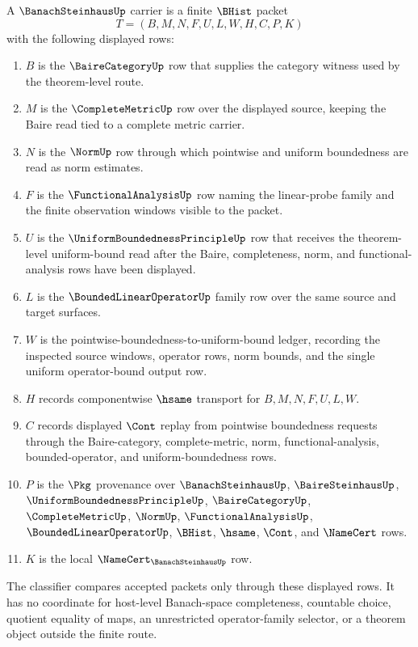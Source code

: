 \begin{definition}
\label{def:banach-steinhaus-carrier}
A $\BanachSteinhausUp$ carrier is a finite $\BHist$ packet
$$
T=(B,M,N,F,U,L,W,H,C,P,K)
$$
with the following displayed rows:
\begin{enumerate}
\item $B$ is the $\BaireCategoryUp$ row that supplies the category witness used by the theorem-level route.
\item $M$ is the $\CompleteMetricUp$ row over the displayed source, keeping the Baire read tied to a complete metric carrier.
\item $N$ is the $\NormUp$ row through which pointwise and uniform boundedness are read as norm estimates.
\item $F$ is the $\FunctionalAnalysisUp$ row naming the linear-probe family and the finite observation windows visible to the packet.
\item $U$ is the $\UniformBoundednessPrincipleUp$ row that receives the theorem-level uniform-bound read after the Baire, completeness, norm, and functional-analysis rows have been displayed.
\item $L$ is the $\BoundedLinearOperatorUp$ family row over the same source and target surfaces.
\item $W$ is the pointwise-boundedness-to-uniform-bound ledger, recording the inspected source windows, operator rows, norm bounds, and the single uniform operator-bound output row.
\item $H$ records componentwise $\hsame$ transport for $B,M,N,F,U,L,W$.
\item $C$ records displayed $\Cont$ replay from pointwise boundedness requests through the Baire-category, complete-metric, norm, functional-analysis, bounded-operator, and uniform-boundedness rows.
\item $P$ is the $\Pkg$ provenance over $\BanachSteinhausUp$, $\BaireSteinhausUp$, $\UniformBoundednessPrincipleUp$, $\BaireCategoryUp$, $\CompleteMetricUp$, $\NormUp$, $\FunctionalAnalysisUp$, $\BoundedLinearOperatorUp$, $\BHist$, $\hsame$, $\Cont$, and $\NameCert$ rows.
\item $K$ is the local $\NameCert_{\BanachSteinhausUp}$ row.
\end{enumerate}
The classifier compares accepted packets only through these displayed rows. It has no coordinate for host-level Banach-space completeness, countable choice, quotient equality of maps, an unrestricted operator-family selector, or a theorem object outside the finite route.
\end{definition}

